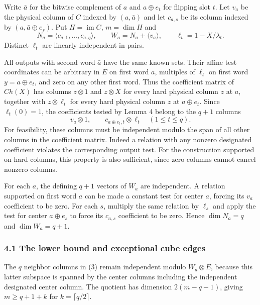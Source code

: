 \documentclass[
  10pt,
]{article}
\begin{document}
Write \(\bar a\) for the bitwise complement of \(a\) and \(a\oplus e_t\)
for flipping slot \(t\). Let \(v_a\) be the physical column of \(C\)
indexed by \((a,\bar a)\) and let \(c_{a,s}\) be its column indexed by
\((a,\bar a\oplus e_s)\). Put \(H=\operatorname{im} C\), \(m=\dim H\)
and \[
 N_a=\langle c_{a,1},\ldots,c_{a,q}\rangle,\qquad
 W_a=N_a+\langle v_a\rangle,\qquad \ell_t=1-X/\lambda_t.
\] Distinct \(\ell_t\) are linearly independent in pairs.

All outputs with second word \(\bar a\) have the same known sets. Their
affine test coordinates can be arbitrary in \(E\) on first word \(a\),
multiples of \(\ell_t\) on first word \(y=a\oplus e_t\), and zero on any
other first word. Thus the coefficient matrix of \(Ch(X)\) has columns
\(z\otimes1\) and \(z\otimes X\) for every hard physical column \(z\) at
\(a\), together with \(z\otimes\ell_t\) for every hard physical column
\(z\) at \(a\oplus e_t\). Since \(\ell_t(0)=1\), the coefficients tested
by Lemma 4 belong to the \(q+1\) columns \[
           v_a\otimes1,\qquad
           c_{a\oplus e_t,t}\otimes\ell_t\quad(1\le t\le q).
 \tag{3}
\] For feasibility, these columns must be independent modulo the span of
all other columns in the coefficient matrix. Indeed a relation with any
nonzero designated coefficient violates the corresponding output test.
For the construction supported on hard columns, this property is also
sufficient, since zero columns cannot cancel nonzero columns.

For each \(a\), the defining \(q+1\) vectors of \(W_a\) are independent.
A relation supported on first word \(a\) can be made a constant test for
center \(a\), forcing its \(v_a\) coefficient to be zero. For each
\(s\), multiply the same relation by \(\ell_s\) and apply the test for
center \(a\oplus e_s\) to force its \(c_{a,s}\) coefficient to be zero.
Hence \(\dim N_a=q\) and \(\dim W_a=q+1\).

\subsubsection{4.1 The lower bound and exceptional cube
edges}\label{the-lower-bound-and-exceptional-cube-edges}

The \(q\) neighbor columns in (3) remain independent modulo
\(W_a\otimes E\), because this latter subspace is spanned by the center
columns including the independent designated center column. The quotient
has dimension \(2(m-q-1)\), giving \(m\ge q+1+k\) for
\(k=\lceil q/2\rceil\).
\end{document}
